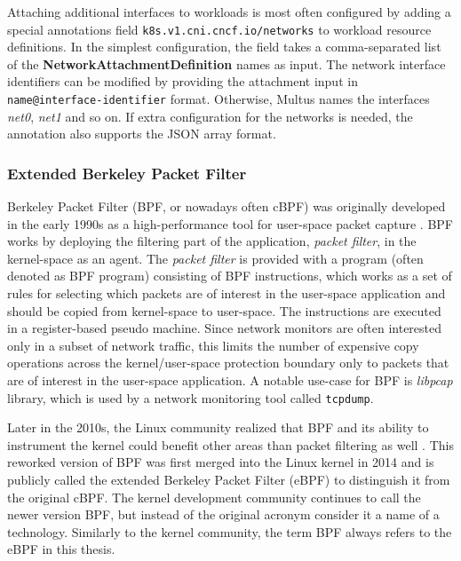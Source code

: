 \documentclass[english, 12pt, a4paper, sci, utf8, a-2b, online]{aaltothesis}
\begin{document}
Attaching additional interfaces to workloads is most often configured by adding a special annotations field \lstinline{k8s.v1.cni.cncf.io/networks} to workload resource definitions.
In the simplest configuration, the field takes a comma-separated list of the \textbf{NetworkAttachmentDefinition} names as input.
The network interface identifiers can be modified by providing the attachment input in \lstinline{name@interface-identifier} format.
Otherwise, Multus names the interfaces \emph{net0}, \emph{net1} and so on.
If extra configuration for the networks is needed, the annotation also supports the JSON array format.

\subsubsection{Extended Berkeley Packet Filter}

Berkeley Packet Filter (BPF, or nowadays often cBPF) was originally developed in the early 1990s as a high-performance tool for user-space packet capture \cite{mccanne1993bsd}.
BPF works by deploying the filtering part of the application, \emph{packet filter}, in the kernel-space as an agent.
The \emph{packet filter} is provided with a program (often denoted as BPF program) consisting of BPF instructions, which works as a set of rules for selecting which packets are of interest in the user-space application and should be copied from kernel-space to user-space.
The instructions are executed in a register-based pseudo machine.
Since network monitors are often interested only in a subset of network traffic, this limits the number of expensive copy operations across the kernel/user-space protection boundary only to packets that are of interest in the user-space application.
A notable use-case for BPF is \emph{libpcap} library, which is used by a network monitoring tool called \lstinline{tcpdump}.

Later in the 2010s, the Linux community realized that BPF and its ability to instrument the kernel could benefit other areas than packet filtering as well \cite{vieira2020fast}.
This reworked version of BPF was first merged into the Linux kernel in 2014 and is publicly called the extended Berkeley Packet Filter (eBPF) to distinguish it from the original cBPF.
The kernel development community continues to call the newer version BPF, but instead of the original acronym consider it a name of a technology.
Similarly to the kernel community, the term BPF always refers to the eBPF in this thesis.
\end{document}
